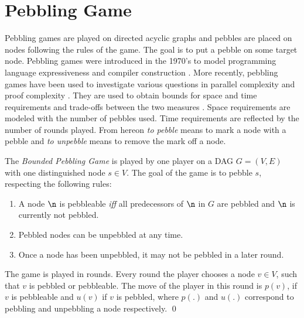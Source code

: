 \section{Pebbling Game}
\label{sec:pebbling-game}

Pebbling games are played on directed acyclic graphs and pebbles are placed on nodes following the rules of the game.
The goal is to put a pebble on some target node.
Pebbling games were introduced in the 1970's to model programming language expressiveness \cite{Pippenger1980,Walker1973} and compiler construction \cite{Sethi1975}. 
More recently, pebbling games have been used to investigate various questions in parallel complexity \cite{Chan2013} and proof complexity \cite{Ben-Sasson2009,Esteban2001,Nordstroem2009}. 
They are used to obtain bounds for space and time requirements and trade-offs between the two measures \cite{EmdeBoas1979,Ben-Sasson2002}.
Space requirements are modeled with the number of pebbles used. 
Time requirements are reflected by the number of rounds played.
From hereon \textit{to pebble} means to mark a node with a pebble and \textit{to unpebble} means to remove the mark off a node.

\begin{definition}
\label{def:pebbling-game}
The \emph{Bounded Pebbling Game} is played by one player on a DAG $G = (V,E)$ with one distinguished node $s \in V$.
The goal of the game is to pebble $s$, respecting the following rules:
\begin{enumerate}
	\item \label{rule:premises} A node $\n$ is pebbleable \emph{iff} all predecessors of $\n$ in $G$ are pebbled and $\n$ is currently not pebbled.
	\item \label{rule:unpebbling} Pebbled nodes can be unpebbled at any time.
	\item \label{rule:onlyonce} Once a node has been unpebbled, it may not be pebbled in a later round.
\end{enumerate}
The game is played in rounds.
Every round the player chooses a node $v \in V$, such that $v$ is pebbled or pebbleable.
The move of the player in this round is $p(v)$, if $v$ is pebbleable and $u(v)$ if $v$ is pebbled, where $p(.)$ and $u(.)$ correspond to pebbling and unpebbling a node respectively.
\qed
\end{definition}

